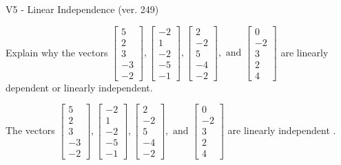 \begin{exercise}
  \begin{exerciseTitle}V5 - Linear Independence (ver. 249)\end{exerciseTitle}
  \begin{exerciseStatement}
    Explain why the vectors \(\left[\begin{array}{r}
5 \\
2 \\
3 \\
-3 \\
-2
\end{array}\right] , \left[\begin{array}{r}
-2 \\
1 \\
-2 \\
-5 \\
-1
\end{array}\right] , \left[\begin{array}{r}
2 \\
-2 \\
5 \\
-4 \\
-2
\end{array}\right] , \text{ and } \left[\begin{array}{r}
0 \\
-2 \\
3 \\
2 \\
4
\end{array}\right]\) are linearly dependent or linearly independent.	


  \end{exerciseStatement}
  \begin{exerciseAnswer}
   The vectors \(\left[\begin{array}{r}
5 \\
2 \\
3 \\
-3 \\
-2
\end{array}\right] , \left[\begin{array}{r}
-2 \\
1 \\
-2 \\
-5 \\
-1
\end{array}\right] , \left[\begin{array}{r}
2 \\
-2 \\
5 \\
-4 \\
-2
\end{array}\right] , \text{ and } \left[\begin{array}{r}
0 \\
-2 \\
3 \\
2 \\
4
\end{array}\right]\) are 
  	 linearly independent  .
  


  \end{exerciseAnswer}
\end{exercise}